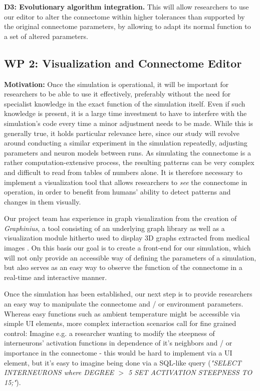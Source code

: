 \documentclass[a4paper,11pt]{article}
\begin{document}
\textbf{D3: Evolutionary algorithm integration.} This will allow researchers to use our editor to alter the connectome within higher tolerances than supported by the original connectome parameters, by allowing to adapt its normal function to a set of altered parameters.
\\[0,2cm]



\subsection{WP 2: Visualization and Connectome Editor}

\textbf{Motivation:}
Once the simulation is operational, it will be important for researchers to be able to use it effectively, preferably without the need for specialist knowledge in the exact function of the simulation itself. Even if such knowledge is present, it is a large time investment to have to interfere with the simulation's code every time a minor adjustment needs to be made. While this is generally true, it holds particular relevance here, since our study will revolve around conducting a similar experiment in the simulation repeatedly, adjusting parameters and neuron models between runs. As simulating the connectome is a rather computation-extensive process, the resulting patterns can be very complex and difficult to read from tables of numbers alone. It is therefore necessary to implement a visualization tool that allows researchers to \emph{see} the connectome in operation, in order to benefit from humans' ability to detect patterns and changes in them visually.

Our project team has experience in graph visualization from the creation of \emph{Graphinius}, a tool consisting of an underlying graph library as well as a visualization module hitherto used to display 3D graphs extracted from medical images \citep{GraphExtractPaper}. On this basis our goal is to create a front-end for our simulation, which will not only provide an accessible way of defining the parameters of a simulation, but also serves as an easy way to observe the function of the connectome in a real-time and interactive manner.


Once the simulation has been established, our next step is to provide researchers an easy way to manipulate the connectome and / or environment parameters. Whereas easy functions such as ambient temperature might be accessible via simple UI elements, more complex interaction scenarios call for fine grained control: Imagine e.g. a researcher wanting to modify the steepness of interneurons' activation functions in dependence of it's neighbors and / or importance in the connectome - this would be hard to implement via a UI element, but it's easy to imagine being done via a SQL-like query (\textit{"SELECT INTERNEURONS where DEGREE $>$ 5 SET ACTIVATION STEEPNESS TO 15;"}).
\end{document}
